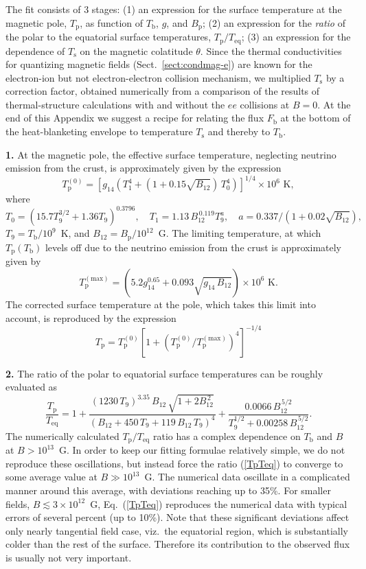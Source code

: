 \documentclass[smallextended]{svjour3}       %
\newcommand{\beq}{\begin{equation}}
\newcommand{\eeq}{\end{equation}}
\newcounter{count}
\newcommand{\req}[1]{Eq.~(\ref{#1})}
\newcommand{\Tb}{T_\mathrm{b}}
\newcommand{\Ts}{T_\mathrm{s}}
\begin{document}
\begin{appendix}
The fit consists of 3 stages: 
(1) an expression for the
surface temperature at the magnetic pole, $T_\mathrm{p}$,
as function of $\Tb$, $g$, and $B_\mathrm{p}$;
(2) an expression for the
\emph{ratio} of the polar to the equatorial surface
temperatures, $T_\mathrm{p}/T_\mathrm{eq}$;
(3) an expression for 
the dependence of $\Ts$ on the magnetic colatitude $\theta$.
Since the thermal conductivities for quantizing magnetic
fields (Sect.~\ref{sect:condmag-e}) are known for the
electron-ion but not electron-electron collision mechanism,
we multiplied $\Ts$ by a correction factor,
obtained numerically from a comparison of the results of
thermal-structure calculations with and without the $ee$
collisions at $B=0$. At the end of this Appendix we suggest
a recipe for relating the flux $F_\mathrm{b}$ at the bottom
of the heat-blanketing envelope to temperature $\Ts$ and thereby to
$\Tb$.

\textbf{1.}
At the magnetic pole, the effective surface temperature,
neglecting neutrino emission from the crust, is
approximately given by the expression
\beq
     T_\mathrm{p}^{(0)}=\left[g_{14}(T_1^4+
(1+0.15\sqrt{B_{12}})\,T_0^4)\right]^{1/4}
\times10^6\mbox{~K},
\eeq
where
\beq
T_0 = (15.7 T_9^{3/2}+1.36
T_9)^{0.3796},
\quad
      T_1 = 1.13\,B_{12}^{\,0.119}T_9^{a},
\quad
      a=0.337/(1+0.02\sqrt{B_{12}}), 
\eeq
$T_9 = \Tb/10^9$~K, and
$B_{12}=B_\mathrm{p}/10^{12}$~G.
The limiting temperature, at which $T_\mathrm{p}(\Tb)$
levels off due to the neutrino emission from the crust is
approximately given by
\beq
      T_\mathrm{p}^\mathrm{(max)}= (5.2 g_{14}^{0.65}+
0.093\sqrt{g_{14}\,B_{12}}) \times10^6\mbox{~K}.
\eeq
The corrected surface temperature at the pole, which takes
this limit into account, is reproduced by the
expression
\beq
   T_\mathrm{p} = T_\mathrm{p}^{(0)} \left[ 1+
(T_\mathrm{p}^{(0)}/T_\mathrm{p}^\mathrm{(max)})^4
\right]^{-1/4}
\label{nu-corr}
\eeq

\textbf{2.}
The ratio of the polar to equatorial surface
temperatures can be roughly evaluated as
\beq
\frac{T_\mathrm{p}}{T_\mathrm{eq}} =
1+ \frac{(1230\,T_9)^{3.35}\,B_{12}\,
     \sqrt{1+2B_{12}^{\,2}} }{ (B_{12}+450\,T_9+
119\,B_{12}\,T_9)^4}
     +  \frac{0.0066\,B_{12}^{\,5/2} }{
         T_9^{1/2}+0.00258\,B_{12}^{\,5/2}}.
\label{TpTeq}
\eeq
The numerically calculated $T_\mathrm{p}/T_\mathrm{eq}$
ratio has a complex dependence on $\Tb$ and $B$ at $B >
10^{13}$~G. In order to keep our fitting formulae relatively
simple, we do not reproduce these oscillations, but instead
force the ratio (\ref{TpTeq}) to converge to some average
value at $B \gg 10^{13}$~G. The numerical data oscillate in
a complicated manner around this average, with deviations
reaching up to 35\%. For smaller fields,
$B\lesssim3\times10^{12}$~G, \req{TpTeq} reproduces the
numerical data with typical errors of several percent (up to
10\%). Note that these significant deviations affect only
nearly tangential field case, viz.\ the equatorial region,
which is substantially colder than the rest of the surface.
Therefore its contribution to the observed flux is usually
not very important.


\end{appendix}
\end{document}
